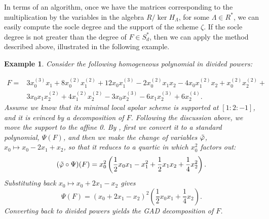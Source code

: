 \documentclass[a4paper,11p]{amsart}
\newtheorem{example0}[defn0]{Example}
\newenvironment{example}{ \begin{example0}\rm}{\end{example0}}
\begin{document}
\medskip

In terms of an algorithm, once we have the matrices corresponding to the multiplication by the variables in the algebra $R/\ker H_\Lambda$, for some $\Lambda\in R^*$, we can easily compute the socle degree and the support of the scheme $\zeta$. If the socle degree is not greater than the degree of $F\in S_d^*$, then we can apply the method described above, illustrated in the following example.

\begin{example}
    Consider the following homogeneous polynomial in divided powers: 

\[
\begin{aligned}
 F=&
3x_0^{(3)} x_1 + 8x_0^{(2)} x_1^{(2)} + 12x_0 x_1^{(3)} - 2x_0^{(2)} x_1 x_2 - 4x_0 x_1^{(2)} x_2 + x_0^{(2)} x_2^{(2)} +  \\
&3x_0 x_1 x_2^{(2)} + 4x_1^{(2)} x_2^{(2)} - 3x_0 x_2^{(3)} - 6x_1 x_2^{(3)} + 6x_2^{(4)}.
\end{aligned}
\]
Assume we know that its minimal local apolar scheme is supported at $[1:2:-1]$, and it is evinced by a decomposition of $F$. Following the discussion above, we move the support to the affine 0. By , first we convert it to a standard polynomial, $\Psi(F)$, and then we make the change of variables $\Tilde{\varphi}$, $x_0 \mapsto x_0-2x_1+x_2$, so that it reduces to a quartic in which $x_0^2$ factors out:
\[
(\Tilde{\varphi} \circ \Psi )(F)=x_0^2 \left(\frac{1}{2}x_0x_1-x_1^2+\frac{1}{2}x_1x_2+\frac{1}{4}x_2^2\right).
\]
Substituting back $x_0 \mapsto x_0+2x_1-x_2$ gives
\[
\Psi(F)=(x_0+2x_1-x_2)^2\left(\frac{1}{2}x_0x_1 + \frac{1}{4}x_2\right).
\]
Converting back to divided powers yields the GAD decomposition of $F$.
\end{example}
\end{document}
